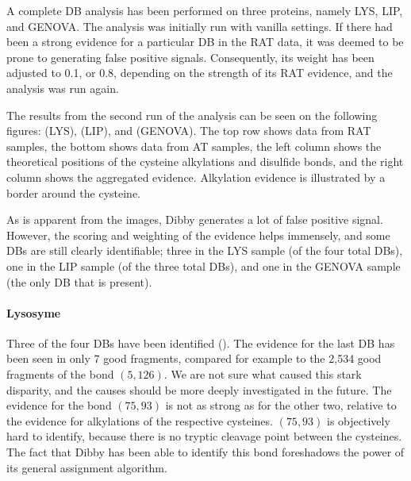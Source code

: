 A complete DB analysis has been performed on three proteins, namely LYS, LIP, and GENOVA\@. The analysis was initially run with vanilla settings. If there had been a strong evidence for a particular DB in the RAT data, it was deemed to be prone to generating false positive signals. Consequently, its weight has been adjusted to 0.1, or 0.8, depending on the strength of its RAT evidence, and the analysis was run again.

The results from the second run of the analysis can be seen on the following figures:  (LYS),  (LIP), and  (GENOVA). The top row shows data from RAT samples, the bottom shows data from AT samples, the left column shows the theoretical positions of the cysteine alkylations and disulfide bonds, and the right column shows the aggregated evidence. Alkylation evidence is illustrated by a border around the cysteine.

As is apparent from the images, Dibby generates a lot of false positive signal. However, the scoring and weighting of the evidence helps immensely, and some DBs are still clearly identifiable; three in the LYS sample (of the four total DBs), one in the LIP sample (of the three total DBs), and one in the GENOVA sample (the only DB that is present).


\paragraph{Lysosyme} Three of the four DBs have been identified (). The evidence for the last DB has been seen in only 7 good fragments, compared for example to the 2,534 good fragments of the bond \((5, 126)\). We are not sure what caused this stark disparity, and the causes should be more deeply investigated in the future. The evidence for the bond \((75, 93)\) is not as strong as for the other two, relative to the evidence for alkylations of the respective cysteines. \((75, 93)\) is objectively hard to identify, because there is no tryptic cleavage point between the cysteines. The fact that Dibby has been able to identify this bond foreshadows the power of its general assignment algorithm.

